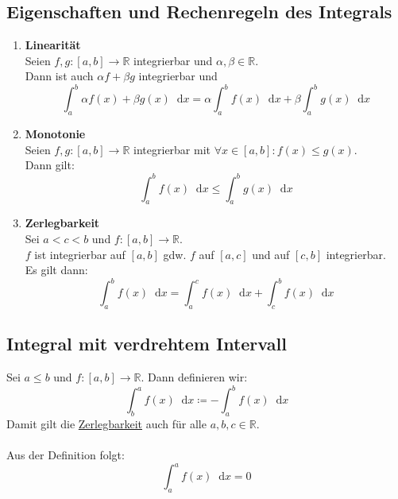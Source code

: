 \documentclass[halfparscip]{scrartcl}
\newcommand*\dif{\mathop{}\!\mathrm{d}}
\newcounter{subsection2}
\begin{document}
\subsection{Eigenschaften und Rechenregeln des Integrals}
\begin{enumerate}
	\item \textbf{Linearität}\\
	Seien $f,g:[a,b] \rightarrow\mathbb{R}$ integrierbar und $\alpha, \beta \in \mathbb{R}$.\\
	Dann ist auch $\alpha f + \beta g$ integrierbar und
	\begin{equation*}
		\int_{a}^{b}\alpha f(x) + \beta g(x) \dif x = \alpha \int_{a}^bf(x)\dif x + \beta \int_a^bg(x)\dif x
	\end{equation*}
	\item \textbf{Monotonie}\\
	Seien $f,g:[a,b] \rightarrow\mathbb{R}$ integrierbar mit $\forall x \in [a,b] : f(x) \leq g(x)$.\\
	Dann gilt:
	\begin{equation*}
		\int_a^bf(x)\dif x \leq \int_a^bg(x)\dif x
	\end{equation*}
	\item \textbf{Zerlegbarkeit}\label{Integration:Eigentschaften_des_Integrals:Zerlegbarkeit}\\
	Sei $a < c < b$ und $f : [a,b] \rightarrow\mathbb{R}$.\\
	$f$ ist integrierbar auf $[a,b]$ gdw. $f$ auf $[a,c]$ und auf $[c,b]$ integrierbar.\\
	Es gilt dann:
	\begin{equation*}
		\int_a^bf(x)\dif x = \int_a^cf(x)\dif x + \int_c^bf(x)\dif x
	\end{equation*}
\end{enumerate}

\subsection{Integral mit \glqq verdrehtem\grqq{} Intervall}
Sei $a \leq b$ und $f: [a,b] \rightarrow \mathbb{R}$. Dann definieren wir:\\
\begin{equation*}
	\int_b^af(x)\dif x \coloneqq - \int_a^bf(x)\dif x
\end{equation*}
Damit gilt die \hyperref[Integration:Eigentschaften_des_Integrals:Zerlegbarkeit]{Zerlegbarkeit} auch für alle $a,b,c \in \mathbb{R}$.\\\\
Aus der Definition folgt:
\begin{equation*}
	\int_{a}^{a}f(x) \dif x = 0
\end{equation*}
\end{document}
